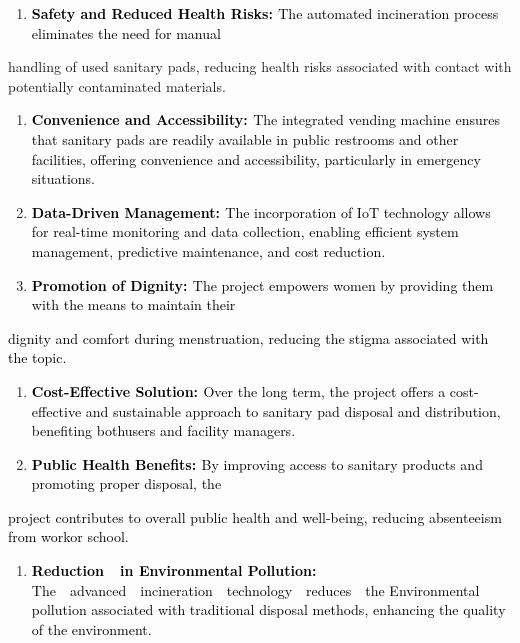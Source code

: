 \documentclass[letterpaper]{article}
\newcounter{saveenum}
\newcommand\liststyleWWNumvii{%
\renewcommand\theenumi{\arabic{enumi}}
\renewcommand\labelenumi{\theenumi.}
\renewcommand\labelitemi{{\textbullet}}
\renewcommand\labelitemii{{\textbullet}}
\renewcommand\labelitemiii{{\textbullet}}
}
\begin{document}
\liststyleWWNumvii
\begin{enumerate}
\item \textbf{\textcolor{black}{Safety and Reduced Health Risks: }}\textcolor{black}{The automated incineration process
eliminates the need for manual}
\end{enumerate}
handling of used sanitary pads, reducing health risks associated with contact with potentially contaminated materials.


\bigskip

\liststyleWWNumvii
\setcounter{saveenum}{\value{enumi}}
\begin{enumerate}
\setcounter{enumi}{\value{saveenum}}
\item \textbf{\textcolor{black}{Convenience and Accessibility: }}\textcolor{black}{The integrated vending machine
ensures that sanitary pads are readily available in public restrooms and other facilities, offering convenience and
accessibility, particularly in emergency situations.}
\item \textbf{\textcolor{black}{Data-Driven Management: }}\textcolor{black}{The incorporation of IoT technology allows
for real-time monitoring and data collection, enabling efficient system management, predictive maintenance, and cost
reduction.}
\item \textbf{\textcolor{black}{Promotion of Dignity: }}\textcolor{black}{The project empowers women by providing them
with the means to maintain their}
\end{enumerate}
\textcolor{black}{dignity and comfort during menstruation, reducing the stigma associated with the topic.}

\liststyleWWNumvii
\setcounter{saveenum}{\value{enumi}}
\begin{enumerate}
\setcounter{enumi}{\value{saveenum}}
\item \textbf{\textcolor{black}{Cost-Effective Solution: }}\textcolor{black}{Over the long term, the project offers a
cost-effective and sustainable approach to sanitary pad disposal and distribution, benefiting bothusers and facility
managers.}
\item \textbf{\textcolor{black}{Public Health Benefits: }}\textcolor{black}{By improving access to sanitary products and
promoting proper disposal, the}
\end{enumerate}
\textcolor{black}{project contributes to overall public health and well-being, reducing absenteeism from workor school.}

\liststyleWWNumvii
\setcounter{saveenum}{\value{enumi}}
\begin{enumerate}
\setcounter{enumi}{\value{saveenum}}
\item \textbf{\textcolor{black}{Reduction\ \ in Environmental Pollution:
}}\textcolor{black}{The\ \ advanced\ \ incineration\ \ technology\ \ reduces\ \ the Environmental pollution associated
with traditional disposal methods, enhancing the quality of the environment.}
\end{enumerate}
\clearpage\setcounter{page}{1}\pagestyle{Convertedxiv}
\end{document}
